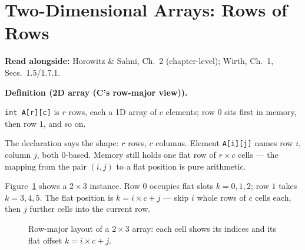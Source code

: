 \documentclass[11pt]{article}
\newenvironment{definitionbox}[1]{%
  \par\noindent\textbf{Definition (#1).}\ \itshape
}{\par\vspace{0.3em}}
\begin{document}
\section{Two-Dimensional Arrays: Rows of Rows}

\textbf{Read alongside:} Horowitz \& Sahni, Ch.~2 (chapter-level); Wirth, Ch.~1, Secs.~1.5/1.7.1.

\begin{definitionbox}{2D array (C's row-major view)}
\texttt{int A[r][c]} is $r$ rows, each a 1D array of $c$ elements; row $0$ sits first in memory, then row $1$, and so on.
\end{definitionbox}

The declaration says the shape: $r$ rows, $c$ columns. Element \texttt{A[i][j]} names row $i$, column $j$, both 0-based. Memory still holds one flat row of $r \times c$ cells --- the mapping from the pair $(i,j)$ to a flat position is pure arithmetic.

Figure~\ref{fig:rowmajor} shows a $2 \times 3$ instance. Row $0$ occupies flat slots $k = 0, 1, 2$; row $1$ takes $k = 3, 4, 5$. The flat position is $k = i \times c + j$ --- skip $i$ whole rows of $c$ cells each, then $j$ further cells into the current row.

\begin{figure}[h]
  \centering
  \caption{Row-major layout of a $2 \times 3$ array: each cell shows its indices and its flat offset $k = i \times c + j$.}
  \label{fig:rowmajor}
\end{figure}
\end{document}
